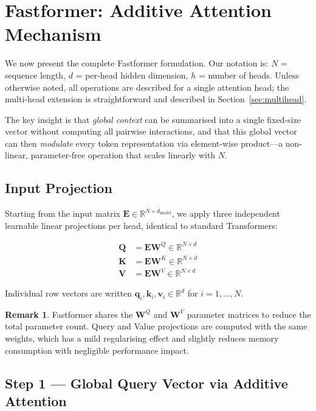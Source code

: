 \documentclass[11pt,a4paper]{article}
\newcommand{\mat}[1]{\mathbf{#1}}
\newcommand{\vect}[1]{\mathbf{#1}}
\newcommand{\R}{\mathbb{R}}
\theoremstyle{definition}
\newtheorem{remark}{Remark}[section]
\begin{document}
\section{Fastformer: Additive Attention Mechanism}
\label{sec:fastformer}

We now present the complete Fastformer formulation.
Our notation is: $N$ = sequence length, $d$ = per-head hidden dimension, $h$ = number of
heads.
Unless otherwise noted, all operations are described for a single attention head; the
multi-head extension is straightforward and described in Section~\ref{sec:multihead}.

The key insight is that \emph{global context} can be summarised into a single fixed-size
vector without computing all pairwise interactions, and that this global vector can then
\emph{modulate} every token representation via element-wise product---a non-linear,
parameter-free operation that scales linearly with $N$.

\subsection{Input Projection}
\label{sec:projection}

Starting from the input matrix $\mat{E}\in\R^{N\times d_{\text{model}}}$, we apply three
independent learnable linear projections per head, identical to standard Transformers:

\begin{align*}
  \mat{Q} &= \mat{E}\mat{W}^{Q} \in \R^{N\times d} \\
  \mat{K} &= \mat{E}\mat{W}^{K} \in \R^{N\times d} \\
  \mat{V} &= \mat{E}\mat{W}^{V} \in \R^{N\times d}
\end{align*}

\noindent Individual row vectors are written $\vect{q}_i,\vect{k}_i,\vect{v}_i\in\R^{d}$ for
$i=1,\ldots,N$.

\begin{remark}
Fastformer shares the $\mat{W}^{Q}$ and $\mat{W}^{V}$ parameter matrices to reduce the
total parameter count.
Query and Value projections are computed with the same weights, which has a mild regularising
effect and slightly reduces memory consumption with negligible performance impact.
\end{remark}

\subsection{Step 1 --- Global Query Vector via Additive Attention}
\label{sec:global_query}
\end{document}
